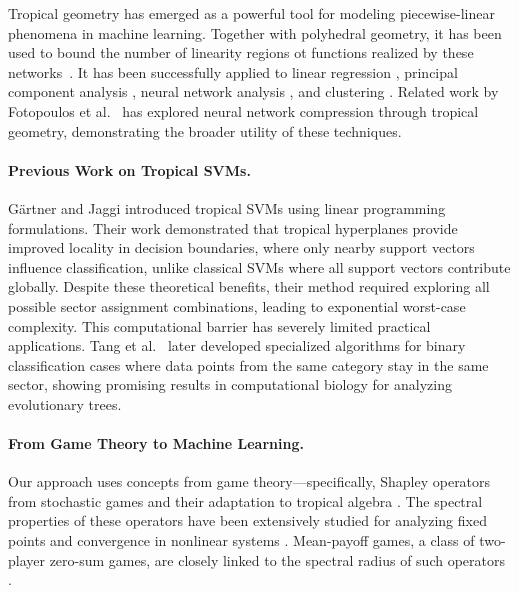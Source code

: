 \documentclass{article}
\begin{document}
Tropical geometry has emerged as a powerful tool for modeling piecewise-linear phenomena in machine learning. Together with polyhedral geometry,
it has been used to bound the number of linearity regions ot functions realized by these networks~\cite{zhang2018,montufar}.
It has been successfully applied to linear regression \cite{maragos2020,akian2020}, principal component analysis \cite{yoshida2019}, neural network analysis \cite{maragos2021}, and clustering \cite{monod2022}. Related work by Fotopoulos et al.~\cite{fotopoulos2024} has explored neural network compression through tropical geometry, demonstrating the broader utility of these techniques.

\paragraph{Previous Work on Tropical SVMs.} Gärtner and Jaggi \cite{gartner2008} introduced tropical SVMs using linear programming formulations. Their work demonstrated that tropical hyperplanes provide improved locality in decision boundaries, where only nearby support vectors influence classification, unlike classical SVMs where all support vectors contribute globally. Despite these theoretical benefits, their method required exploring all possible sector assignment combinations, leading to exponential worst-case complexity. This computational barrier has severely limited practical applications. Tang et al.~\cite{tang2020} later developed specialized algorithms for binary classification cases where data points from the same category stay in the same sector, showing promising results in computational biology for analyzing evolutionary trees.

\paragraph{From Game Theory to Machine Learning.} Our approach uses concepts from game theory—specifically, Shapley operators from stochastic games \cite{shapley1953} and their adaptation to tropical algebra \cite{kolokoltsov1997}. The spectral properties of these operators have been extensively studied for analyzing fixed points and convergence in nonlinear systems \cite{gaubert2004}. Mean-payoff games, a class of two-player zero-sum games, are closely linked to the spectral radius of such operators \cite{zwick1996}. 
\end{document}
